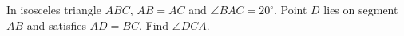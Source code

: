 In isosceles triangle $ABC$, $AB=AC$ and $\angle BAC=20^\circ$. Point $D$ lies on segment $AB$ and satisfies $AD=BC$. Find $\angle DCA$.
